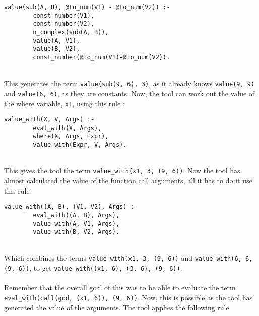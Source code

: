 \begin{lstlisting}[firstnumber=197]
value(sub(A, B), @to_num(V1) - @to_num(V2)) :- 
		const_number(V1), 
		const_number(V2), 
		n_complex(sub(A, B)), 
		value(A, V1), 
		value(B, V2), 
		const_number(@to_num(V1)-@to_num(V2)).
\end{lstlisting}
\mbox{} \\
This generates the term \lstinline{value(sub(9, 6), 3)}, as it already knows \lstinline{value(9, 9)} and \lstinline{value(6, 6)}, as they are constants. Now, the tool can work out the value of the where variable, \lstinline{x1}, using this rule : \\

\begin{lstlisting}[firstnumber=90]
value_with(X, V, Args) :- 
		eval_with(X, Args), 
		where(X, Args, Expr), 
		value_with(Expr, V, Args).
\end{lstlisting}
\mbox{} \\
This gives the tool the term \lstinline{value_with(x1, 3, (9, 6))}. Now the tool has almost calculated the value of the function call arguments, all it has to do it use this rule \\%

\begin{lstlisting}[firstnumber=85]
value_with((A, B), (V1, V2), Args) :- 
		eval_with((A, B), Args), 
		value_with(A, V1, Args), 
		value_with(B, V2, Args).
\end{lstlisting}
\mbox{} \\
Which combines the terms \lstinline{value_with(x1, 3, (9, 6))} and \lstinline{value_with(6, 6, (9, 6))}, to get \lstinline{value_with((x1, 6), (3, 6), (9, 6))}. \\ \\ %
Remember that the overall goal of this was to be able to evaluate the term \lstinline{eval_with(call(gcd, (x1, 6)), (9, 6))}. Now, this is possible as the tool has generated the value of the arguments. The tool applies the following rule \\ %

